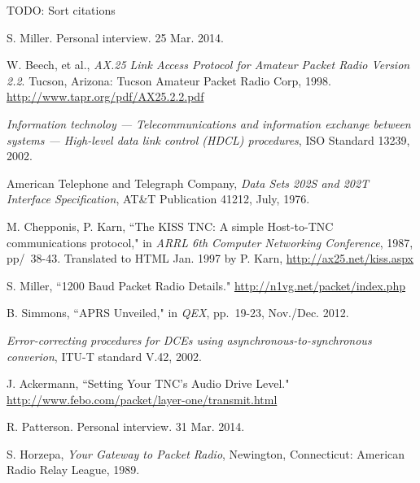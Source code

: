 \documentclass[12pt,letterpaper]{article}
\begin{document}
\begin{thebibliography}{99}

		TODO: Sort citations

		S. Miller. Personal interview. 25 Mar. 2014.

		W. Beech, et al.,
		\emph{AX.25 Link Access Protocol for Amateur Packet Radio Version 2.2}.
		Tucson, Arizona: Tucson Amateur Packet Radio Corp, 1998. 
		\url{http://www.tapr.org/pdf/AX25.2.2.pdf}

		\emph{Information technoloy --- Telecommunications and information
			exchange between systems --- High-level data link control (HDCL)
		procedures}, ISO Standard 13239, 2002.

		American Telephone and Telegraph Company,
		\emph{Data Sets 202S and 202T Interface Specification},
		AT\&T Publication 41212,
		July, 1976.

		M. Chepponis, P. Karn,
		``The KISS TNC: A simple Host-to-TNC communications protocol,"
		in \emph{ARRL 6th Computer Networking Conference},
		1987, pp/~38-43.
		Translated to HTML Jan. 1997 by P. Karn,
		\url{http://ax25.net/kiss.aspx}

		S. Miller,
		``1200 Baud Packet Radio Details."
		\url{http://n1vg.net/packet/index.php}

		B. Simmons,
		``APRS Unveiled," in \emph{QEX},
		pp.~19-23,
		Nov./Dec. 2012.

		\emph{Error-correcting procedures for DCEs using 
		asynchronous-to-synchronous converion}, ITU-T standard V.42, 2002.

		J. Ackermann,
		``Setting Your TNC's Audio Drive Level."
		\url{http://www.febo.com/packet/layer-one/transmit.html}

		R. Patterson. Personal interview. 31 Mar. 2014.

		S. Horzepa,
		\emph{Your Gateway to Packet Radio},
		Newington, Connecticut: American Radio Relay League, 1989.

\end{thebibliography}
\end{document}

